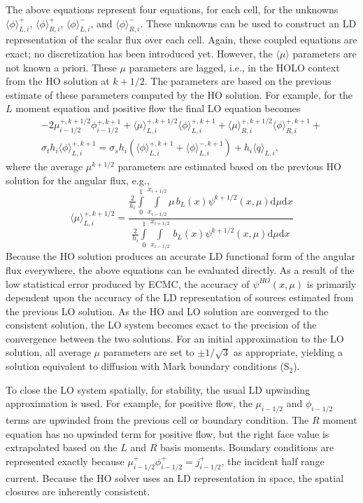 \documentclass{mc2013}
\renewcommand{\d}{\mathrm{d}}
\newcommand{\mom}[1]{\langle #1 \rangle}
\newcommand{\xl}{{x_{i-1/2}}}
\newcommand{\xr}{{x_{i+1/2}}}
\begin{document}
The above equations represent four equations, for each cell, for the unknowns $\mom{\phi}_{L,i}^+$,
$\mom{\phi}_{R,i}^+$, $\mom{\phi}_{L,i}^-$, and $\mom{\phi}_{R,i}^-$.  These unknowns can
be used to construct an LD representation of the scalar flux over each cell.
Again, these coupled equations are exact; no discretization has been introduced
yet.  However, the $\mom{\mu}$ parameters are not known a priori.  These $\mu$
parameters are lagged, i.e., in the HOLO context from the HO solution at $k+1/2$.  The parameters are based on the previous estimate of these parameters computed
by the HO solution.  For example, for the $L$ moment equation and positive flow the
final LO equation becomes
\begin{multline}
  -2{\mu}_{i-1/2}^{+,k+1/2} \phi_{i-1/2}^{+,k+1} + \mom {\mu}_{L,i}^{+,k+1/2}
  \mom{\phi}_{L,i}^{+,k+1}
  +  \mom\mu_{R,i}^{+,k+1/2}
  \mom{\phi}_{R,i}^{+,k+1} + \\  \sigma_t h_i \mom{\phi}_{L,i}^{+,k+1}  =  \sigma_s
  h_i \left( \mom{\phi}_{L,i}^{+,k+1} +
  \mom\phi_{L,i}^{-,k+1}\right) + h_i \mom{q}_{L,i},
\end{multline}
where the average $\mu^{k+1/2}$ parameters are estimated based on the previous HO solution
for the angular flux, e.g.,
\begin{equation}\displaystyle 
\mom{{\mu}}_{L,i}^{+,k+1/2} = \frac{\displaystyle 
  \frac{2}{h_i} \int\limits_0^1 \int\limits_\xl^\xr \mu \, b_L(x) \psi^{k+1/2}(x,\mu) \d \mu \d x } 
  {\displaystyle \frac{2}{h_i} \int\limits_0^1 \int\limits_\xl^\xr \, b_L(x)
\psi^{k+1/2}(x,\mu) \d \mu \d x } 
\end{equation}
Because the HO solution produces an accurate LD functional form of the angular flux
everywhere,
the above equations can be evaluated directly.  As a result of the low statistical error produced by ECMC, the accuracy of $\psi^{HO}(x,\mu)$
is primarily dependent upon the accuracy of the LD representation of sources estimated from the
previous LO solution.  As the HO and LO solution are converged to the consistent solution,
the LO system becomes exact to the precision of the convergence between the two solutions. 
For an initial approximation to the LO solution, all average $\mu$ parameters are
set to $\pm 1/\sqrt{3}$ as appropriate, yielding a solution equivalent to diffusion
with Mark boundary conditions (S$_2$).

To close the LO system spatially, for stability, the usual LD upwinding
approximation is used.  For example, for positive flow, the $\mu_{i-1/2}$ and $\phi_{i-1/2}$
terms are upwinded from the previous cell or boundary condition.  The $R$ moment equation has no upwinded term for positive flow, but
the right face value is extrapolated based on the $L$ and $R$ basis moments.
Boundary conditions are represented exactly because $\mu_{i-1/2}^+
\phi_{i-1/2}^+ = j_{i-1/2}^+$, the incident half range current.  Because the HO
solver uses an LD representation in space, the spatial closures are inherently
consistent.  
\end{document}

